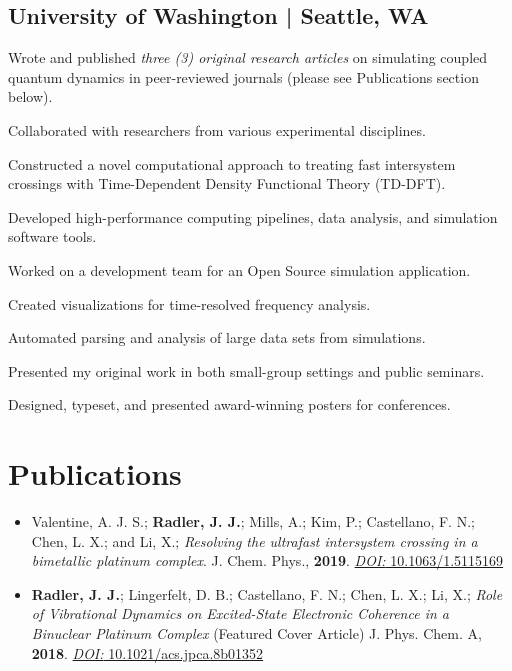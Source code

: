 \documentclass[letterpaper]{radler-resume-class}
\begin{document}
\begin{minipage}[t]{0.65\textwidth}
\subsection{University of Washington | Seattle, WA}
\begin{tightitemize}
\item Wrote and published \textit{three (3) original research articles} on simulating coupled quantum dynamics in peer-reviewed journals (please see Publications section below).
\item Collaborated with researchers from various experimental disciplines. 
\item Constructed a novel computational approach to treating fast intersystem crossings with Time-Dependent Density Functional Theory (TD-DFT).
\item Developed high-performance computing pipelines, data analysis, and simulation software tools. 
\item Worked on a development team for an Open Source simulation application. 
\item Created visualizations for time-resolved frequency analysis.
\item Automated parsing and analysis of large data sets from simulations.
\item Presented my original work in both small-group settings and public seminars.
\item Designed, typeset, and presented award-winning posters for conferences. 
\end{tightitemize}
\sectionspace %

\section{Publications}
\sectionspace
\begin{itemize}
\item Valentine, A. J. S.; \textbf{Radler, J. J.}; Mills, A.; Kim, P.; Castellano, F. N.; Chen, L. X.; and Li, X.;	\textit{Resolving the ultrafast intersystem crossing in a bimetallic platinum complex}. J. Chem. Phys., \textbf{2019}. \href{https://doi.org/10.1063/1.5115169}{\textit{DOI: }10.1063/1.5115169}

\item \textbf{Radler, J. J.}; Lingerfelt, D. B.; Castellano, F. N.; Chen, L. X.; Li, X.;	\textit{Role of Vibrational Dynamics on Excited-State Electronic Coherence in a Binuclear Platinum Complex} (Featured Cover Article) J. Phys. Chem. A, \textbf{2018}. \href{https://pubs.acs.org/doi/10.1021/acs.jpca.8b01352}{\textit{DOI:} 10.1021/acs.jpca.8b01352}


\end{itemize}
\end{minipage}
\end{document}
